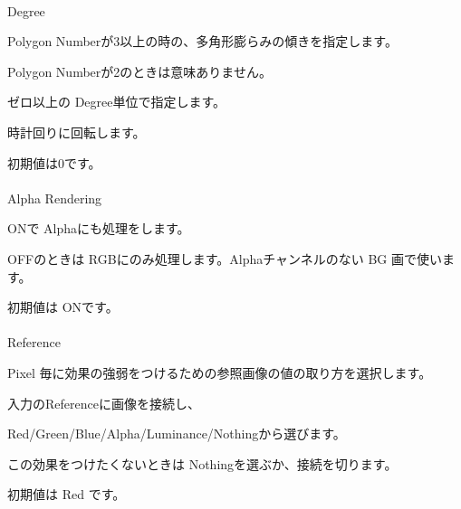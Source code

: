 \documentclass[a4paper,12pt]{article}
\begin{document}
\newpage

\thispagestyle{empty}

\ \vspace{-0.2em}
\\
\par
\noindent Degree\par
\textquotedbl Polygon Number\textquotedbl が3以上の時の、多角形膨らみの傾きを指定します。\par
\textquotedbl Polygon Number\textquotedbl が2のときは意味ありません。\par
ゼロ以上の Degree単位で指定します。\par
時計回りに回転します。\par
初期値は0です。\\
\\
Alpha Rendering\par
ONで Alphaにも処理をします。\par
OFFのときは RGBにのみ処理します。Alphaチャンネルのない BG 画で使います。\par
初期値は ONです。\\
\\
Reference\par
Pixel 毎に効果の強弱をつけるための参照画像の値の取り方を選択します。\par
入力の\textquotedbl Reference\textquotedbl に画像を接続し、\par
Red/Green/Blue/Alpha/Luminance/Nothingから選びます。\par
この効果をつけたくないときは Nothingを選ぶか、接続を切ります。\par
初期値は Red です。
\end{document}
